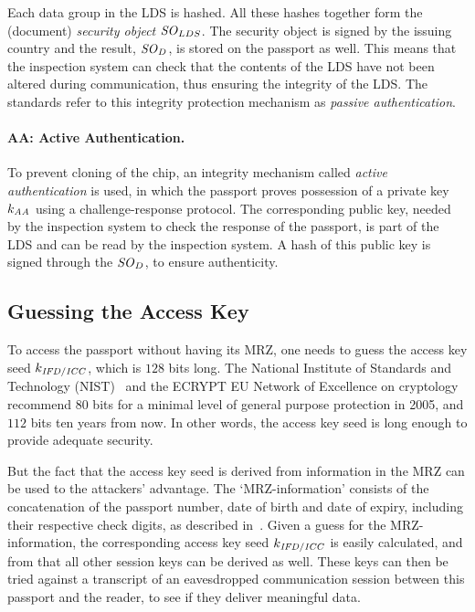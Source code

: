 \documentclass[runningheads,envcountsame,envcountsect,oribibl]{llncs}
\newcommand{\seckey}[1]{{k_{\id{#1}}}}
\newcommand{\privkey}[1]{\seckey{#1}}
\newcommand{\SOD}{\id{SO}_D}
\newcommand{\SOLDS}{\id{SO}_{LDS}}
\begin{document}
Each data group in the LDS is hashed. All these hashes together form
the (document) \emph{security object} $\SOLDS$. The security object
is signed by the issuing country and the result, $\SOD$, is stored on
the passport as well. This means that
the inspection system can check that the contents of the LDS have not been
altered during communication, thus ensuring the integrity of the LDS. The
standards refer to this integrity protection mechanism as
\emph{passive authentication}.

\paragraph{AA: Active Authentication.}

To prevent cloning of the chip, an integrity mechanism called
\emph{active authentication} is used, in which the passport
proves possession of a private key $\privkey{AA}$ using a
challenge-response
protocol. The corresponding public key, needed by the inspection
system to check the response of the passport, is part of the LDS
and can be read by the inspection system. A hash of this public
key is signed through the $\SOD$, to ensure authenticity. 



\subsection{Guessing the Access Key}
\label{subsec-guess}


To access the passport without having its MRZ, one needs to guess the access
key seed $\seckey{IFD/ICC}$, which is $128$ bits long.  The National Institute
of Standards and Technology (NIST)~\cite{nist-keys} and the ECRYPT EU Network
of Excellence on cryptology~\cite{ecrypt-keylength} recommend $80$ bits for a
minimal level of general purpose protection in 2005, and $112$ bits ten years
from now.  In other words, the access key seed is long enough to provide
adequate security.

But the fact that the access key seed is derived from information in the MRZ can be
used to the attackers' advantage.  The `MRZ-information'
consists of the concatenation of the passport number, date of birth
and date of expiry, including their respective check digits, as described
in~\cite{icao03:doc9303}. Given a guess for the MRZ-information, the
corresponding access key seed $\seckey{IFD/ICC}$ is easily calculated, and from
that all other session keys can be derived as well. These keys can then be
tried against a transcript of an eavesdropped communication session between
this passport and the reader, to see if they deliver meaningful data. 
\end{document}
